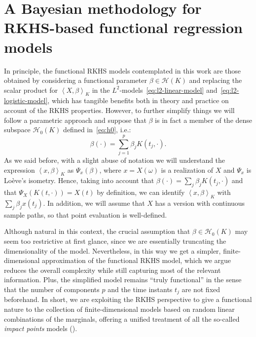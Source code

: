 \documentclass{article}
\numberwithin{equation}{section}
\theoremstyle{plain}
\theoremstyle{definition}
\newcommand{\Hcal}{\mathcal{H}}
\newcommand\dotprod[2]{\left\langle#1,#2\right\rangle}
\begin{document}
\section{A Bayesian methodology for RKHS-based functional regression models}\label{sec:methodology}

In principle, the functional RKHS models contemplated in this work are those obtained by considering a functional parameter \(\beta \in \Hcal(K)\) and replacing the scalar product for \(\dotprod{X}{\beta}_K\) in the \(L^2\)-models~\eqref{eq:l2-linear-model} and~\eqref{eq:l2-logistic-model}, which has tangible benefits both in theory and practice on account of the RKHS properties. However, to further simplify things we will follow a parametric approach and suppose that \(\beta\) is in fact a member of the dense subspace \(\Hcal_0(K)\) defined in~\eqref{eq:h0}, i.e.:
\begin{equation}\label{eq:beta}
  \beta(\cdot) = \sum_{j=1}^p \beta_j K(t_j, \cdot).
\end{equation}
As we said before, with a slight abuse of notation we will understand the expression \(\dotprod{x}{\beta}_K\) as \(\Psi_x(\beta)\), where \(x=X(\omega)\) is a realization of \(X\) and \(\Psi_x\) is Loève's isometry. Hence, taking into account that \(\beta(\cdot)=\sum_j \beta_j K(t_j,\cdot)\) and that \(\Psi_X(K(t, \cdot)) = X(t)\) by definition, we can identify \(\dotprod{x}{\beta}_K\) with \(\sum_j \beta_j x(t_j)\). In addition, we will assume that \(X\) has a version with continuous sample paths, so that point evaluation is well-defined.

Although natural in this context, the crucial assumption that \(\beta \in \Hcal_0(K)\) may seem too restrictive at first glance, since we are essentially truncating the dimensionality of the model. Nevertheless, in this way we get a simpler, finite-dimensional approximation of the functional RKHS model, which we argue reduces the overall complexity while still capturing most of the relevant information. Plus, the simplified model remains ``truly functional'' in the sense that the number of components \(p\) and the time instants \(t_j\) are not fixed beforehand. In short, we are exploiting the RKHS perspective to give a functional nature to the collection of finite-dimensional models based on random linear combinations of the marginals, offering a unified treatment of all the so-called \textit{impact points} models (\citealp[see][]{lindquist2009logistic, kneip2016functional,poss2020superconsistent}).
\end{document}
